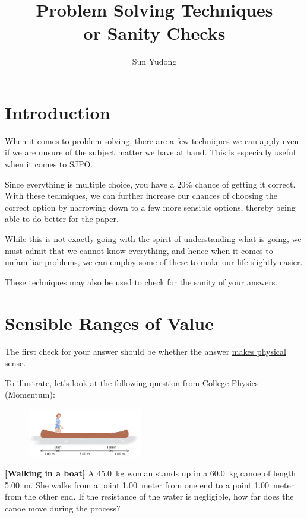 \documentclass[11pt]{article}
\title{Problem Solving Techniques\\ {\large or Sanity Checks}}
\author{Sun Yudong}
\begin{document}
	\maketitle
	\section*{Introduction}
	When it comes to problem solving, there are a few techniques we can apply even if we are unsure of the subject matter we have at hand. This is especially useful when it comes to SJPO. 
	
	Since everything is multiple choice, you have a 20\% chance of getting it correct. With these techniques, we can further increase our chances of choosing the correct option by narrowing down to a few more sensible options, thereby being able to do better for the paper.
	
	While this is not exactly going with the spirit of understanding what is going, we must admit that we cannot know everything, and hence when it comes to unfamiliar problems, we can employ some of these to make our life slightly easier. 
	
	These techniques may also be used to check for the sanity of your answers. 
	
	\section{Sensible Ranges of Value}
	The first check for your answer should be whether the answer \underline{makes physical sense.}
	
	To illustrate, let's look at the following question from College Physics (Momentum):
	\begin{shaded}
		\begin{figure}
			\centering
			\vspace{-0.4cm}
			\includegraphics[width=5cm]{canoe.png}
			\vspace{-0.4cm}
		\end{figure}
		\textbf{[Walking in a boat]} A \SI{45.0}{\kilogram} woman stands up in a \SI{60.0}{\kilogram} canoe of length \SI{5.00}{\meter}. She walks from a point \SI{1.00}{meter} from one end to a point \SI{1.00}{meter} from the other end. If the resistance of the water is negligible, how far does the canoe move during the process?
	\end{shaded}
	
\end{document}
